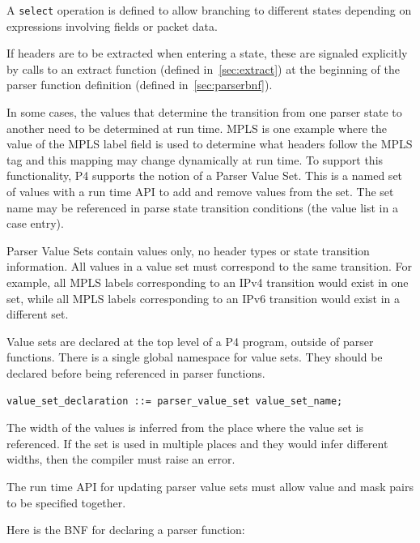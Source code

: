 \documentclass[12pt]{article}
\begin{document}
A \texttt{select} operation is defined to allow branching to different
states depending on expressions involving fields or packet data.

If headers are to be extracted when entering a state, these are
signaled explicitly by calls to an extract function (defined in~\ref{sec:extract}) 
at the beginning of the parser function definition (defined in~\ref{sec:parserbnf}).


In some cases, the values that determine the transition from one
parser state to another need to be determined at run time. MPLS is one
example where the value of the MPLS label field is used to determine
what headers follow the MPLS tag and this mapping may change
dynamically at run time. To support this functionality, P4 supports
the notion of a Parser Value Set. This is a named set of values with a
run time API to add and remove values from the set. The set name may
be referenced in parse state transition conditions (the value list in
a case entry).

Parser Value Sets contain values only, no header types or state transition 
information. All values in a value set must correspond to the same transition. 
For example, all MPLS labels corresponding to an IPv4 transition would exist 
in one set, while all MPLS labels corresponding to an IPv6 transition would 
exist in a different set.

Value sets are declared at the top level of a P4 program, outside of parser 
functions. There is a single global namespace for value sets. They should 
be declared before being referenced in parser functions.

\begin{lstlisting}[style=BNFstyle]
value_set_declaration ::= parser_value_set value_set_name;
\end{lstlisting}

The width of the values is inferred from the place where the value set is 
referenced.  If the set is used in multiple places and they would infer
different widths, then the compiler must raise an error.

The run time API for updating parser value sets must allow value and mask
pairs to be specified together.


Here is the BNF for declaring a parser function:
\end{document}
